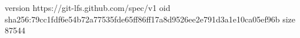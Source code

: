 version https://git-lfs.github.com/spec/v1
oid sha256:79cc1fdf6e54b72a77535fde65ff86ff17a8d9526ee2e791d3a1e10ca05ef96b
size 87544
